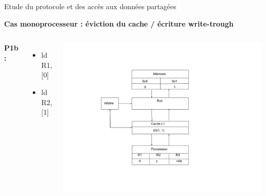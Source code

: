\documentclass{beamer}
\begin{document}
\begin{frame}{Etude du protocole et des accès aux données partagées}
    \addtocounter{framenumber}{-1}
    \textbf{Cas monoprocesseur : éviction du cache / écriture write-trough}
    \begin{columns}[c] %

        \textbf{P1b : }
        \begin{itemize}
            \item ld R1, [0]
            \item ld R2, [1]
        \end{itemize}

        \includegraphics[scale=0.28]{f2b.png}
        
    \end{columns}
\end{frame}
\end{document}

